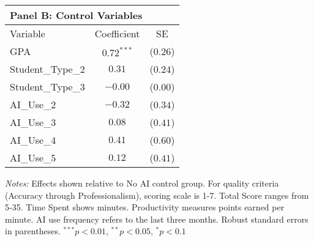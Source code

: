 \begin{table}[!htbp]
\vspace{0.3cm}

\begin{tabular}{lcc}
\multicolumn{3}{l}{\textbf{Panel B: Control Variables}} \\
\hline\hline
Variable & Coefficient & SE \\
\hline
GPA & $0.72^{***}$ & ($0.26$) \\
Student_Type_2 & $0.31$ & ($0.24$) \\
Student_Type_3 & $-0.00$ & ($0.00$) \\
AI_Use_2 & $-0.32$ & ($0.34$) \\
AI_Use_3 & $0.08$ & ($0.41$) \\
AI_Use_4 & $0.41$ & ($0.60$) \\
AI_Use_5 & $0.12$ & ($0.41$) \\
\hline
\end{tabular}
\begin{tablenotes}
\small
\item \textit{Notes:} Effects shown relative to No AI control group. For quality criteria (Accuracy through Professionalism), scoring scale is 1-7. Total Score ranges from 5-35. Time Spent shows minutes. Productivity measures points earned per minute. AI use frequency refers to the last three months. Robust standard errors in parentheses. $^{***}p<0.01$, $^{**}p<0.05$, $^{*}p<0.1$
\end{tablenotes}
\end{table}